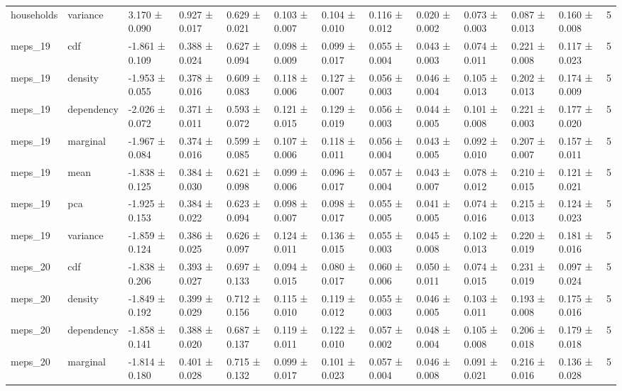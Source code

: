 \begin{table}
\begin{tabular}{llllllllllllr}
households & variance & 3.170 ± 0.090 & 0.927 ± 0.017 & 0.629 ± 0.021 & 0.103 ± 0.007 & 0.104 ± 0.010 & 0.116 ± 0.012 & 0.020 ± 0.002 & 0.073 ± 0.003 & 0.087 ± 0.013 & 0.160 ± 0.008 & 5 \\
meps_19 & cdf & -1.861 ± 0.109 & 0.388 ± 0.024 & 0.627 ± 0.094 & 0.098 ± 0.009 & 0.099 ± 0.017 & 0.055 ± 0.004 & 0.043 ± 0.003 & 0.074 ± 0.011 & 0.221 ± 0.008 & 0.117 ± 0.023 & 5 \\
meps_19 & density & -1.953 ± 0.055 & 0.378 ± 0.016 & 0.609 ± 0.083 & 0.118 ± 0.006 & 0.127 ± 0.007 & 0.056 ± 0.003 & 0.046 ± 0.004 & 0.105 ± 0.013 & 0.202 ± 0.013 & 0.174 ± 0.009 & 5 \\
meps_19 & dependency & -2.026 ± 0.072 & 0.371 ± 0.011 & 0.593 ± 0.072 & 0.121 ± 0.015 & 0.129 ± 0.019 & 0.056 ± 0.003 & 0.044 ± 0.005 & 0.101 ± 0.008 & 0.221 ± 0.003 & 0.177 ± 0.020 & 5 \\
meps_19 & marginal & -1.967 ± 0.084 & 0.374 ± 0.016 & 0.599 ± 0.085 & 0.107 ± 0.006 & 0.118 ± 0.011 & 0.056 ± 0.004 & 0.043 ± 0.005 & 0.092 ± 0.010 & 0.207 ± 0.007 & 0.157 ± 0.011 & 5 \\
meps_19 & mean & -1.838 ± 0.125 & 0.384 ± 0.030 & 0.621 ± 0.098 & 0.099 ± 0.006 & 0.096 ± 0.017 & 0.057 ± 0.004 & 0.043 ± 0.007 & 0.078 ± 0.012 & 0.210 ± 0.015 & 0.121 ± 0.021 & 5 \\
meps_19 & pca & -1.925 ± 0.153 & 0.384 ± 0.022 & 0.623 ± 0.094 & 0.098 ± 0.007 & 0.098 ± 0.017 & 0.055 ± 0.005 & 0.041 ± 0.005 & 0.074 ± 0.016 & 0.215 ± 0.013 & 0.124 ± 0.023 & 5 \\
meps_19 & variance & -1.859 ± 0.124 & 0.386 ± 0.025 & 0.626 ± 0.097 & 0.124 ± 0.011 & 0.136 ± 0.015 & 0.055 ± 0.003 & 0.045 ± 0.008 & 0.102 ± 0.013 & 0.220 ± 0.019 & 0.181 ± 0.016 & 5 \\
meps_20 & cdf & -1.838 ± 0.206 & 0.393 ± 0.027 & 0.697 ± 0.133 & 0.094 ± 0.015 & 0.080 ± 0.017 & 0.060 ± 0.006 & 0.050 ± 0.011 & 0.074 ± 0.015 & 0.231 ± 0.019 & 0.097 ± 0.024 & 5 \\
meps_20 & density & -1.849 ± 0.192 & 0.399 ± 0.029 & 0.712 ± 0.156 & 0.115 ± 0.010 & 0.119 ± 0.012 & 0.055 ± 0.003 & 0.046 ± 0.005 & 0.103 ± 0.011 & 0.193 ± 0.008 & 0.175 ± 0.016 & 5 \\
meps_20 & dependency & -1.858 ± 0.141 & 0.388 ± 0.020 & 0.687 ± 0.137 & 0.119 ± 0.011 & 0.122 ± 0.010 & 0.057 ± 0.002 & 0.048 ± 0.004 & 0.105 ± 0.008 & 0.206 ± 0.018 & 0.179 ± 0.018 & 5 \\
meps_20 & marginal & -1.814 ± 0.180 & 0.401 ± 0.028 & 0.715 ± 0.132 & 0.099 ± 0.017 & 0.101 ± 0.023 & 0.057 ± 0.004 & 0.046 ± 0.008 & 0.091 ± 0.021 & 0.216 ± 0.016 & 0.136 ± 0.028 & 5 \\

\end{tabular}
\end{table}
